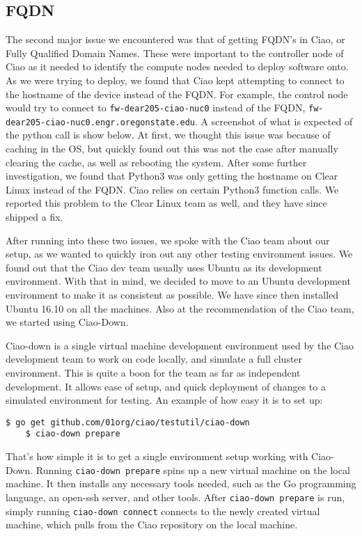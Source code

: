 \documentclass[10pt,onecolumn,journal,draftclsnofoot]{IEEEtran}
\begin{document}
\subsection{FQDN}
The second major issue we encountered was that of getting FQDN's in Ciao, or
Fully Qualified Domain Names. These were important to the controller node of
Ciao as it needed to identify the compute nodes needed to deploy software onto.
As we were trying to deploy, we found that Ciao kept attempting to connect to
the hostname of the device instead of the FQDN. For example, the control node
would try to connect to \texttt{fw-dear205-ciao-nuc0} instead of the FQDN,
\texttt{fw-dear205-ciao-nuc0.engr.oregonstate.edu}. A screenshot of what is
expected of the python call is show below. At first, we thought this issue was
because of caching in the OS, but quickly found out this was not the case after
manually clearing the cache, as well as rebooting the system.  After some
further investigation, we found that Python3 was only getting the hostname on
Clear Linux instead of the FQDN. Ciao relies on certain Python3 function calls.
We reported this problem to the Clear Linux team as well, and they have since
shipped a fix. 

After running into these two issues, we spoke with the Ciao team about our
setup, as we wanted to quickly iron out any other testing environment issues.
We found out that the Ciao dev team usually uses Ubuntu as its development
environment. With that in mind, we decided to move to an Ubuntu development
environment to make it as consistent as possible. We have since then installed
Ubuntu 16.10 on all the machines. Also at the recommendation of the Ciao team,
we started using Ciao-Down.

Ciao-down is a single virtual machine development
environment used by the Ciao development team to work on code locally, and 
simulate a full cluster environment. This is quite a boon for the team as far
as independent development. It allows ease of setup, and quick deployment of
changes to a simulated environment for testing. An example of how easy it is
to set up:\cite{ciao-down}

\begin{lstlisting}[caption = Simplicity of Ciao-Down setup]
	$ go get github.com/01org/ciao/testutil/ciao-down
	$ ciao-down prepare

\end{lstlisting}

That's how simple it is to get a single environment setup working with 
Ciao-Down. Running \texttt{ciao-down prepare} spins up a new virtual machine
on the local machine. It then installs any necessary tools needed, such as the
Go programming language, an open-ssh server, and other tools. After 
\texttt{ciao-down prepare} is run, simply running
\texttt{ciao-down connect} connects to the newly created virtual machine, which
pulls from the Ciao repository on the local machine.
\end{document}
